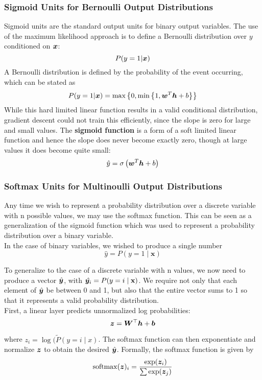 \begin{multicols}{2}
	\subsubsection{Sigmoid Units for Bernoulli Output Distributions}
	Sigmoid units are the standard output units for binary output variables.
	The use of the maximum likelihood approach is to define a Bernoulli distribution over $y$ conditioned on $\bol{x}$:
	\[ P(y=1|\bol{x}) \]
	A Bernoulli distribution is defined by the probability of the event occurring, which can be stated as
	\[ P(y=1|\bol{x}) = \max \left\{ 0,\min \left\{ 1, \bol{w}^T\bol{h}+b \right\} \right\} \]
	While this hard limited linear function results in a valid conditional distribution, gradient descent could not train this efficiently, since the slope is zero for large and small values.
	The \textbf{sigmoid function} is a form of a soft limited linear function and hence the slope does never become exactly zero, though at large values it does become quite small:
	\[ \hat{y} = \sigma \left(\bol{w}^T\bol{h}+b\right) \]


	\subsubsection{Softmax Units for Multinoulli Output Distributions}
	Any time we wish to represent a probability distribution over a discrete variable with n possible values, we may use the softmax function. This can be seen as a	generalization of the sigmoid function which was used to represent a probability distribution over a binary variable.\\
	In the case of binary variables, we wished to produce a single number
	\[ \hat{y} = P(y = 1 \mid \textbf{x})\]
	
	To generalize to the case of a discrete variable with n values, we now need	to produce a vector $\hat{{\bm{y}}}$, with $\hat{{\bm{y}}_{i}} = P(y = i \mid \textbf{x})$. We require not only that each element of $\hat{{\bm{y}}}$ be between 0 and 1, but also that the entire vector sums to 1 so that it represents a valid probability distribution.\\
	First, a linear	layer predicts unnormalized log probabilities:
	\[ {\bm{z}} =  {\bm{W}}^\top {\bm{h}} + {\bm{b}}\]
	
	where $z_{i} = \log(\tilde{P}(y = i \mid x)$. The softmax function can then exponentiate and	normalize ${\bm{z}}$ to obtain the desired $\hat{{\bm{y}}}$. Formally, the softmax function is given by
	\[ \mathrm{softmax}({\bm{z}})_{i} = \frac{\exp({\bm{z}}_{i})}{\sum \exp({\bm{z}}_{j})} \]
	

\end{multicols}
